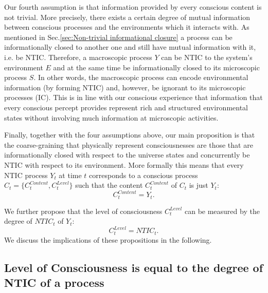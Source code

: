\documentclass[utf8]{article}
\begin{document}
        Our fourth assumption is that information provided by every conscious content is not trivial. More precisely, there exists a certain degree of mutual information between conscious processes and the environments which it interacts with. As mentioned in Sec.\ref{sec:Non-trivial informational closure} a process can be informationally closed to another one and still have mutual information with it, i.e. be NTIC. Therefore, a macroscopic process $Y$ can be NTIC to the system's environment $E$ and at the same time be informationally closed to its microscopic process $S$. In other words, the macroscopic process can encode environmental information (by forming NTIC) and, however, be ignorant to its microscopic processes (IC). This is in line with our conscious experience that information that every conscious percept provides represent rich and structured environmental states without involving much information at microscopic activities.
        
        Finally, together with the four assumptions above, our main proposition is that the coarse-graining that physically represent consciousnesses are those that are informationally closed with respect to the universe states and concurrently be NTIC with respect to its environment. More formally this means that every NTIC process $Y_t$ at time $t$ corresponds to a conscious process $C_t=\{C_t^{Content},C_t^{Level}\}$ such that the content $C_{t}^{Content}$ of $C_t$ is just $Y_t$:
		\begin{equation}\label{eq:cContent}
			C_{t}^{Content} = Y_{t}.
		\end{equation}
		
		
		\noindent
        We further propose that the level of consciousness $C_{t}^{Level}$ can be measured by the degree of $NTIC_{t}$ of $Y_t$:
		\begin{equation}\label{eq:cLevel}
			C_{t}^{Level} = NTIC_{t}.
		\end{equation}
		We discuss the implications of these propositions in the following. 	
		
		
	    \subsection{Level of Consciousness is equal to the degree of NTIC of a process}\label{sec:cl}
            
\end{document}
